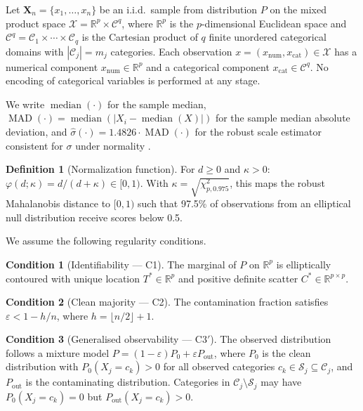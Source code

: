\documentclass[11pt]{article}
\theoremstyle{plain}
\theoremstyle{definition}
\newtheorem{definition}{Definition}
\newtheorem{condition}{Condition}
\DeclareMathOperator{\MAD}{MAD}
\DeclareMathOperator{\median}{median}
\newcommand{\R}{\mathbb{R}}
\newcommand{\C}{\mathcal{C}}
\newcommand{\X}{\mathcal{X}}
\begin{document}
Let $\mathbf{X}_n = \{x_1, \ldots, x_n\}$ be an i.i.d.\
sample from distribution $P$ on the mixed product space
$\X = \R^p \times \C^q$,
where $\R^p$ is the $p$-dimensional Euclidean space and
$\C^q = \C_1 \times \cdots \times \C_q$ is the Cartesian
product of $q$ finite unordered categorical domains with
$|\C_j| = m_j$ categories. Each observation
$x = (x_\text{num}, x_\text{cat}) \in \X$ has a numerical
component $x_\text{num} \in \R^p$ and a categorical
component $x_\text{cat} \in \C^q$. No encoding of
categorical variables is performed at any stage.

We write $\median(\cdot)$ for the sample median,
$\MAD(\cdot) = \median(|X_i - \median(X)|)$ for the sample
median absolute deviation, and
$\widehat{\sigma}(\cdot) = 1.4826 \cdot \MAD(\cdot)$
for the robust scale estimator consistent for $\sigma$
under normality \citep{rousseeuw2018}.

\begin{definition}[Normalization function]
\label{def:phi}
For $d \geq 0$ and $\kappa > 0$:
$\varphi(d;\kappa) = d/(d + \kappa) \in [0,1)$.
With $\kappa = \sqrt{\chi^2_{p,0.975}}$, this maps the
robust Mahalanobis distance to $[0,1)$ such that 97.5\%
of observations from an elliptical null distribution
receive scores below 0.5.
\end{definition}

\noindent We assume the following regularity conditions.

\begin{condition}[Identifiability --- C1]
The marginal of $P$ on $\R^p$ is elliptically contoured
with unique location $T^* \in \R^p$ and positive definite
scatter $C^* \in \R^{p \times p}$.
\end{condition}

\begin{condition}[Clean majority --- C2]
The contamination fraction satisfies $\varepsilon <
1 - h/n$, where $h = \lfloor n/2 \rfloor + 1$.
\end{condition}

\begin{condition}[Generalised observability --- C3$'$]
\label{cond:c3prime}
The observed distribution follows a mixture model
$P = (1-\varepsilon)P_0 + \varepsilon P_\text{out}$,
where $P_0$ is the clean distribution with
$P_0(X_j = c_k) > 0$ for all observed categories
$c_k \in \mathcal{S}_j \subseteq \C_j$, and
$P_\text{out}$ is the contaminating distribution.
Categories in $\C_j \setminus \mathcal{S}_j$ may have
$P_0(X_j = c_k) = 0$ but $P_\text{out}(X_j = c_k) > 0$.
\end{condition}
\end{document}
